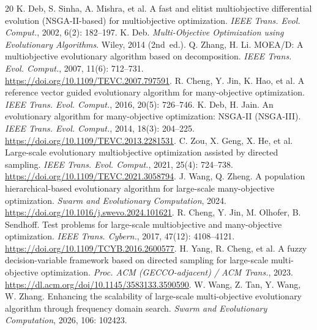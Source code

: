 \documentclass[preprint,12pt]{elsarticle}
\begin{document}
\begin{thebibliography}{20}
\label{refs}
K. Deb, S. Sinha, A. Mishra, et al.
\newblock A fast and elitist multiobjective differential evolution
(\textsc{NSGA-II}-based) for multiobjective optimization.
\newblock \emph{IEEE Trans. Evol. Comput.}, 2002, 6(2): 182--197.
K. Deb. \emph{Multi-Objective Optimization using Evolutionary Algorithms}.
\newblock Wiley, 2014 (2nd~ed.).
Q. Zhang, H. Li.
\newblock MOEA/D: A multiobjective evolutionary algorithm based on decomposition.
\newblock \emph{IEEE Trans. Evol. Comput.}, 2007, 11(6): 712--731.
\newblock \url{https://doi.org/10.1109/TEVC.2007.797591}.
R. Cheng, Y. Jin, K. Hao, et al.
\newblock A reference vector guided evolutionary algorithm for many-objective
optimization.
\newblock \emph{IEEE Trans. Evol. Comput.}, 2016, 20(5): 726--746.
K. Deb, H. Jain.
\newblock An evolutionary algorithm for many-objective optimization: NSGA-II
(NSGA-III).
\newblock \emph{IEEE Trans. Evol. Comput.}, 2014, 18(3): 204--225.
\newblock \url{https://doi.org/10.1109/TEVC.2013.2281531}.
C. Zou, X. Geng, X. He, et al.
\newblock Large-scale evolutionary multiobjective optimization assisted by
directed sampling.
\newblock \emph{IEEE Trans. Evol. Comput.}, 2021, 25(4): 724--738.
\newblock \url{https://doi.org/10.1109/TEVC.2021.3058794}.
J. Wang, Q. Zheng.
\newblock A population hierarchical-based evolutionary algorithm for
large-scale many-objective optimization.
\newblock \emph{Swarm and Evolutionary Computation}, 2024.
\newblock \url{https://doi.org/10.1016/j.swevo.2024.101621}.
R. Cheng, Y. Jin, M. Olhofer, B. Sendhoff.
\newblock Test problems for large-scale multiobjective and many-objective
optimization.
\newblock \emph{IEEE Trans. Cybern.}, 2017, 47(12): 4108--4121.
\newblock \url{https://doi.org/10.1109/TCYB.2016.2600577}.
H. Yang, R. Cheng, et al.
\newblock A fuzzy decision-variable framework based on directed sampling for
large-scale multi-objective optimization.
\newblock \emph{Proc. ACM (GECCO-adjacent) / ACM Trans.}, 2023.
\newblock \url{https://dl.acm.org/doi/10.1145/3583133.3590590}.
W. Wang, Z. Tan, Y. Wang, W. Zhang.
\newblock Enhancing the scalability of large-scale multi-objective
evolutionary algorithm through frequency domain search.
\newblock \emph{Swarm and Evolutionary Computation}, 2026, 106: 102423.

\end{thebibliography}
\end{document}
